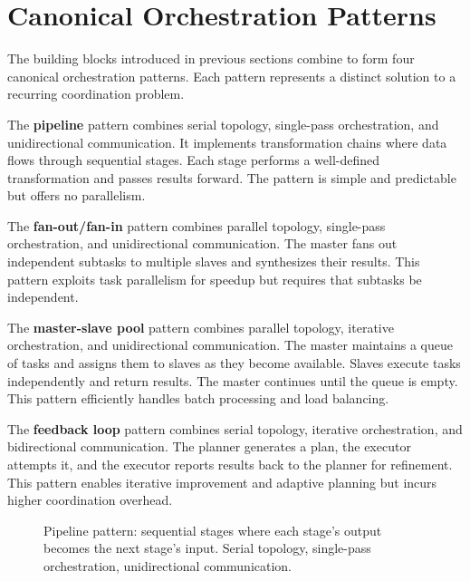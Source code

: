 \section{Canonical Orchestration Patterns}\label{sec:canonical}

The building blocks introduced in previous sections combine to form four canonical orchestration patterns. Each pattern represents a distinct solution to a recurring coordination problem.

The \textbf{pipeline} pattern combines serial topology, single-pass orchestration, and unidirectional communication. It implements transformation chains where data flows through sequential stages. Each stage performs a well-defined transformation and passes results forward. The pattern is simple and predictable but offers no parallelism.

The \textbf{fan-out/fan-in} pattern combines parallel topology, single-pass orchestration, and unidirectional communication. The master fans out independent subtasks to multiple slaves and synthesizes their results. This pattern exploits task parallelism for speedup but requires that subtasks be independent.

The \textbf{master-slave pool} pattern combines parallel topology, iterative orchestration, and unidirectional communication. The master maintains a queue of tasks and assigns them to slaves as they become available. Slaves execute tasks independently and return results. The master continues until the queue is empty. This pattern efficiently handles batch processing and load balancing.

The \textbf{feedback loop} pattern combines serial topology, iterative orchestration, and bidirectional communication. The planner generates a plan, the executor attempts it, and the executor reports results back to the planner for refinement. This pattern enables iterative improvement and adaptive planning but incurs higher coordination overhead.

\begin{figure}[t]
\centering
{}
\caption{Pipeline pattern: sequential stages where each stage's output becomes the next stage's input. Serial topology, single-pass orchestration, unidirectional communication.}
\label{fig:pattern_pipeline}
\end{figure}

